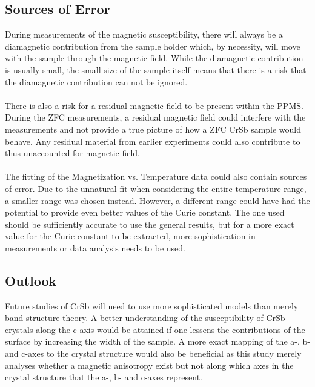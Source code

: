 \subsection{Sources of Error}
    During measurements of the magnetic susceptibility, there will always be a diamagnetic contribution from the sample holder which, by necessity, 
    will move with the sample through the magnetic field. While the diamagnetic contribution is usually small, the small size of the sample itself 
    means that there is a risk that the diamagnetic contribution can not be ignored. 
    \\ \\
    There is also a risk for a residual magnetic field to be present within the PPMS. During the ZFC measurements, a residual magnetic field could 
    interfere with the measurements and not provide a true picture of how a ZFC CrSb sample would behave. Any residual material from earlier 
    experiments could also contribute to thus unaccounted for magnetic field.
    \\ \\
    The fitting of the Magnetization vs. Temperature data could also contain sources of error. Due to the unnatural fit when considering the entire 
    temperature range, a smaller range was chosen instead. However, a different range could have had the potential to provide even better values of 
    the Curie constant. The one used should be sufficiently accurate to use the general results, but for a more exact value for the Curie constant 
    to be extracted, more sophistication in measurements or data analysis needs to be used.
\subsection{Outlook}
    Future studies of CrSb will need to use more sophisticated models than merely band structure theory. A better understanding of the susceptibility 
    of CrSb crystals along the c-axis would be attained if one lessens the contributions of the surface by increasing the width of the sample. A more 
    exact mapping of the a-, b- and c-axes to the crystal structure would also be beneficial as this study merely analyses whether a magnetic anisotropy 
    exist but not along which axes in the crystal structure that the a-, b- and c-axes represent. 